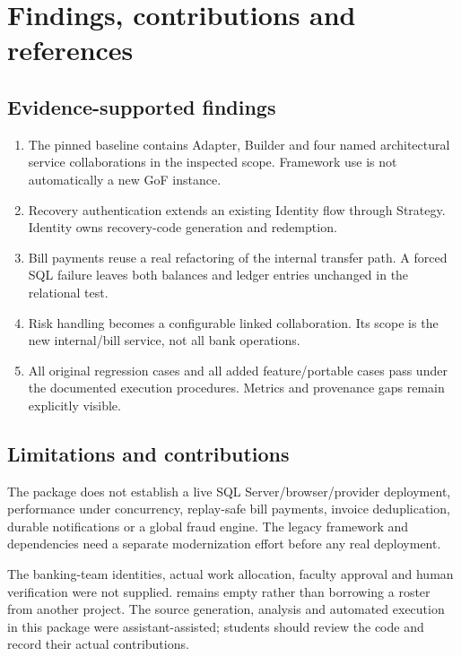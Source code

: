 \documentclass[11pt,a4paper]{article}
\newcommand{\code}[1]{\texttt{\detokenize{#1}}}
\begin{document}
\section{Findings, contributions and references}
\subsection{Evidence-supported findings}
\begin{enumerate}
\item The pinned baseline contains Adapter, Builder and four named architectural service collaborations in the inspected scope. Framework use is not automatically a new GoF instance.
\item Recovery authentication extends an existing Identity flow through Strategy. Identity owns recovery-code generation and redemption.
\item Bill payments reuse a real refactoring of the internal transfer path. A forced SQL failure leaves both balances and ledger entries unchanged in the relational test.
\item Risk handling becomes a configurable linked collaboration. Its scope is the new internal/bill service, not all bank operations.
\item All original regression cases and all added feature/portable cases pass under the documented execution procedures. Metrics and provenance gaps remain explicitly visible.
\end{enumerate}
\subsection{Limitations and contributions}
The package does not establish a live SQL Server/browser/provider deployment, performance under concurrency, replay-safe bill payments, invoice deduplication, durable notifications or a global fraud engine. The legacy framework and dependencies need a separate modernization effort before any real deployment.

The banking-team identities, actual work allocation, faculty approval and human verification were not supplied. \code{team.json} remains empty rather than borrowing a roster from another project. The source generation, analysis and automated execution in this package were assistant-assisted; students should review the code and record their actual contributions.
\end{document}
